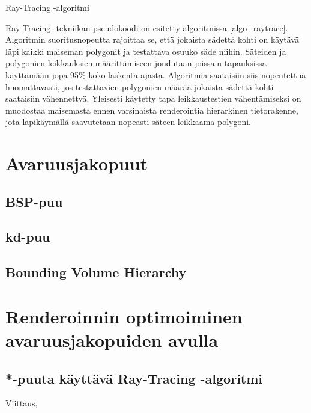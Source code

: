 \documentclass[a4paper,12pt, titlepage]{article}
\theoremstyle{break}
\begin{document}
\begin{algorithm}
\caption{Ray-Tracing -algoritmi}\label{algo_raytrace}
\end{algorithm}

Ray-Tracing -tekniikan pseudokoodi on esitetty algoritmissa \ref{algo_raytrace}.\\

Algoritmin suoritusnopeutta rajoittaa se, että jokaista sädettä kohti on käytävä läpi kaikki maiseman polygonit ja testattava osuuko säde niihin. Säteiden ja polygonien leikkauksien määrittämiseen joudutaan joissain tapauksissa käyttämään jopa 95\% koko laskenta-ajasta.\cite{whitted} Algoritmia saataisiin siis nopeutettua huomattavasti, jos testattavien polygonien määrää jokaista sädettä kohti saataisiin vähennettyä. Yleisesti käytetty tapa leikkaustestien vähentämiseksi on muodostaa maisemasta ennen varsinaista renderointia hierarkinen tietorakenne, jota läpikäymällä saavutetaan nopeasti säteen leikkaama polygoni.\cite{rubin}

\section{Avaruusjakopuut}
\subsection{BSP-puu}
\subsection{kd-puu}
\subsection{Bounding Volume Hierarchy}

\section{Renderoinnin optimoiminen avaruusjakopuiden avulla}
\subsection{*-puuta käyttävä Ray-Tracing -algoritmi}
Viittaus\cite{ranta},\cite{samet}\cite{havran}

\newpage

\listofalgorithms
\end{document}

